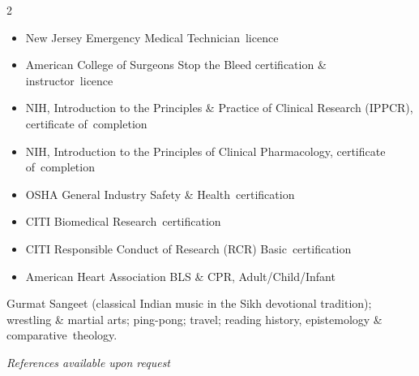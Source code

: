 \begin{multicols}{2}\raggedright\begin{itemize}
  \item New Jersey Emergency Medical \cvkeep{}Technician~\cvlast{}licence\cvkeepend{}
  \item American College of Surgeons Stop the Bleed certification \& \cvkeep{}instructor~\cvlast{}licence\cvkeepend{}
  \item NIH, Introduction to the Principles \& Practice of Clinical Research (IPPCR), certificate \cvkeep{}of~\cvlast{}completion\cvkeepend{}
  \item NIH, Introduction to the Principles of Clinical Pharmacology, certificate \cvkeep{}of~\cvlast{}completion\cvkeepend{}
  \item OSHA General Industry Safety \& \cvkeep{}Health~\cvlast{}certification\cvkeepend{}
  \item CITI Biomedical \cvkeep{}Research~\cvlast{}certification\cvkeepend{}
  \item CITI Responsible Conduct of Research (RCR) \cvkeep{}Basic~\cvlast{}certification\cvkeepend{}
  \item American Heart Association BLS \& CPR, \cvkeep{}\cvlast{}Adult/Child/Infant\cvkeepend{}
\end{itemize}\end{multicols}

\noindent Gurmat Sangeet (classical Indian music in the Sikh devotional tradition); wrestling \& martial arts; ping-pong; travel; reading history, epistemology \& \cvkeep{}comparative~\cvlast{}theology.\cvkeepend{}\par

\vspace{16pt}\noindent\textit{\textit{References available upon request}}


